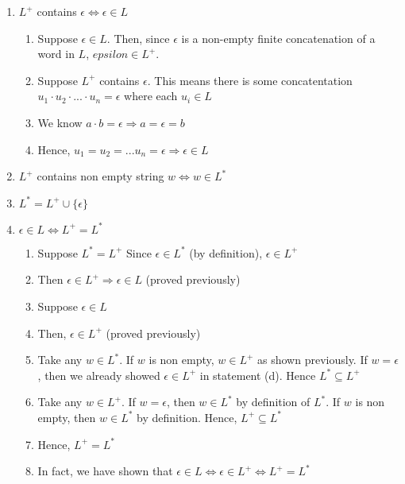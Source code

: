 \documentclass{article}
\begin{document}
\begin{enumerate}
\item $L^+$ contains $\epsilon \iff \epsilon \in L $
\begin{enumerate}
\item Suppose $\epsilon \in L$. Then, since $\epsilon$ is a non-empty finite
concatenation of a word in $L$, $epsilon \in L^+$.
\item Suppose $L^+$ contains $\epsilon$. This means there is some concatentation
$ u_1 \cdot u_2 \cdot ... \cdot u_n = \epsilon$ where each $u_i \in L$
\item We know $a \cdot b = \epsilon \Rightarrow a = \epsilon = b$
\item Hence, $u_1 = u_2 = ... u_n = \epsilon \Rightarrow \epsilon \in L$
\end{enumerate}
\item $L^+$ contains non empty string $w \iff w \in L^*$
\item $L^* = L^+ \cup \{\epsilon\}$
\item $ \epsilon \in L \iff L^+ = L^* $
\begin{enumerate}
\item Suppose $L^* = L^+$ Since $ \epsilon \in L^*$ (by definition), $\epsilon \in L^+$
\item Then $ \epsilon \in L^+ \Rightarrow \epsilon \in L$ (proved previously)
\item Suppose $\epsilon \in L$
\item Then, $\epsilon \in L^+$ (proved previously)
\item Take any $w \in L^*$. If $w$ is non empty, $w \in L^+$ as shown
previously. If $w = \epsilon$, then we already showed $\epsilon \in L^+$ in
statement (d). Hence $ L^* \subseteq L^+$
\item Take any $w \in L^+$. If $w = \epsilon$, then $w \in L^*$ by definition of
$L^*$. If $w$ is non empty, then $w \in L^*$ by definition. Hence, $L^+
\subseteq L^*$
\item Hence, $L^+ = L^*$
\item In fact, we have shown that $\epsilon \in L \iff \epsilon \in L^+ \iff L^+
= L^*$
\end{enumerate}
\end{enumerate}
\end{document}
